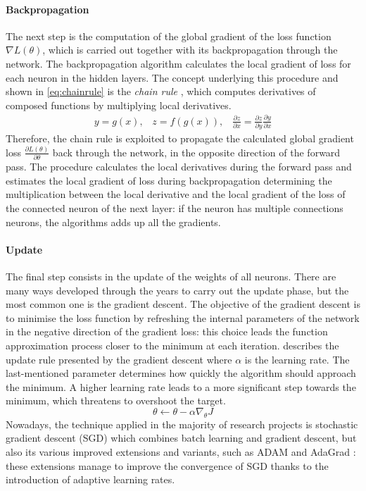 \paragraph{Backpropagation}
The next step is the computation of the global gradient of the loss function $\nabla L(\theta)$, which is carried out together with its backpropagation through the network.
The backpropagation algorithm \cite{rumelhart1988learning} calculates the local gradient of loss for each neuron in the hidden layers.
The concept underlying this procedure and shown in \vref{eq:chainrule} is the \textit{chain rule} \cite{lecun2015deep}, which computes derivatives of composed functions by multiplying local derivatives.
\begin{equation}\label{eq:chainrule}
	\begin{gathered}
		y = g(x), \;\;\; z = f(g(x)),  \;\;\;
		\frac{\partial z}{\partial x} = \frac{\partial z}{\partial y} \frac{\partial y}{\partial x}
	\end{gathered}
\end{equation}
Therefore, the chain rule is exploited to propagate the calculated global gradient loss $\frac{\partial L(\theta)}{\partial \theta}$ back through the network, in the opposite direction of the forward pass.
The procedure calculates the local derivatives during the forward pass and estimates the local gradient of loss during backpropagation determining the multiplication between the local derivative and the local gradient of the loss of the connected neuron of the next layer: if the neuron has multiple connections neurons, the algorithms adds up all the gradients.

\paragraph{Update} The final step consists in the update of the weights of all neurons.
There are many ways developed through the years to carry out the update phase, but the most common one is the gradient descent.
The objective of the gradient descent is to minimise the loss function by refreshing the internal parameters of the network in the negative direction of the gradient loss: this choice leads the function approximation process closer to the minimum at each iteration.
 describes the update rule presented by the gradient descent where $\alpha$ is the learning rate.
The last-mentioned parameter determines how quickly the algorithm should approach the minimum.
A higher learning rate leads to a more significant step towards the minimum, which threatens to overshoot the target.
\begin{equation}\label{eq:update}
	\theta \leftarrow \theta -\alpha \nabla_\theta J
\end{equation}
Nowadays, the technique applied in the majority of research projects is stochastic gradient descent (SGD) which combines batch learning \cite{stanford2019cs231n} and gradient descent, but also its various improved extensions and variants, such as ADAM \cite{kingma2014adam} and AdaGrad \cite{duchi2011adaptive}: these extensions manage to improve the convergence of SGD thanks to the introduction of adaptive learning rates.

